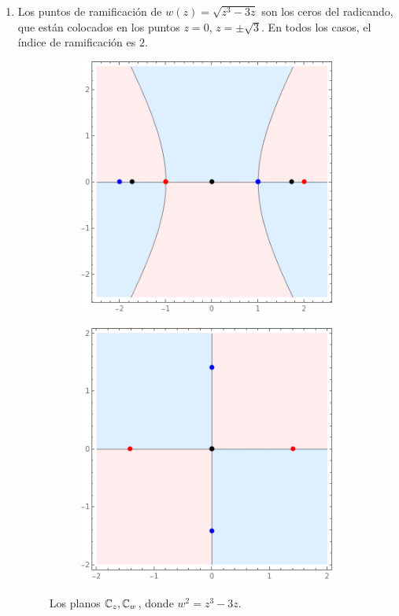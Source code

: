 \begin{solution}
\begin{itemize}
\begin{enumerate}[label=\alph*)]
        \item Los puntos de ramificación de $w(z) = \sqrt {z^3 - 3z}$ son los ceros del radicando, que están colocados en los puntos $z = 0$, $z = \pm \sqrt 3$. En todos los casos, el índice de ramificación es $2$.
        \begin{figure}[h]
            \centering
            \begin{subfigure}{.4\textwidth}
                \centering
                \includegraphics[scale=0.4]{ramification/4-z.png}
            \end{subfigure}
            \begin{subfigure}{.4\textwidth}
                \centering
                \includegraphics[scale=0.4]{ramification/4-w.png}
            \end{subfigure}
            \caption{Los planos $\mathbb C_z, \mathbb C_w$, donde $w^2 = z^3 - 3z$.}
        \end{figure}
        

\end{enumerate}
\end{itemize}
\end{solution}
